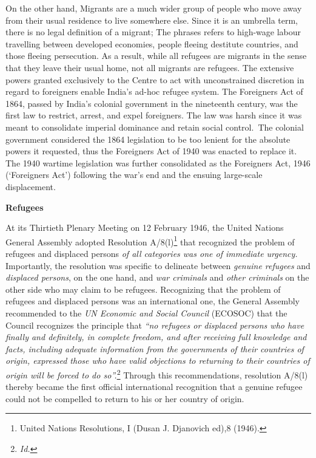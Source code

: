 \begin{multicols}{2}
\vspace{-.15cm}

\noi
On the other hand, Migrants are a much wider group of people who move away from their
usual residence to live somewhere else. Since it is an umbrella term, there is no legal
definition of a migrant; The phrases refers to high-wage labour travelling between developed
economies, people fleeing destitute countries, and those fleeing persecution. As a result,
while all refugees are migrants in the sense that they leave their usual home, not all migrants
are refugees. The extensive powers granted exclusively to the Centre to act with
unconstrained discretion in regard to foreigners enable India's ad-hoc refugee system. The
Foreigners Act of 1864, passed by India's colonial government in the nineteenth century, was
the first law to restrict, arrest, and expel foreigners. The law was harsh since it was meant to
consolidate imperial dominance and retain social control.~The colonial government
considered the 1864 legislation to be too lenient for the absolute powers it requested, thus the
Foreigners Act of 1940 was enacted to replace it. The 1940 wartime legislation was further
consolidated as the Foreigners Act, 1946 (‘Foreigners Act’) following the war's end and the
ensuing large-scale displacement.

\vspace{.2cm}


\vspace{.1cm}

\noi
{\normalsize\bfseries {Refugees}}

\vspace{-.2cm}

\noi
At its Thirtieth Plenary Meeting on 12 February 1946, the United Nations General Assembly
adopted Resolution A/8(l)\footnote{United Nations Resolutions, I (Dusan J. Djanovich ed),8 (1946).} that recognized the problem of refugees and displaced persons \textit{of
all categories was one of immediate urgency.} Importantly, the resolution was specific to
delineate between \textit{genuine refugees} and \textit{displaced persons}, on the one hand, and \textit{war
criminals} and \textit{other criminals} on the other side who may claim to be refugees.
Recognizing that the problem of refugees and displaced persons was an international one, the
General Assembly recommended to the \textit{UN Economic and Social Council} (ECOSOC) that the
Council recognizes the principle that \textit{“no refugees or displaced persons who have finally and
definitely, in complete freedom, and after receiving full knowledge and facts, including
adequate information from the governments of their countries of origin, expressed those who
have valid objections to returning to their countries of origin will be forced to do so”.}\footnote{\textit{Id.}}
Through this recommendations, resolution A/8(l) thereby became the first official
international recognition that a genuine refugee could not be compelled to return to his or her
country of origin. 


\end{multicols}
